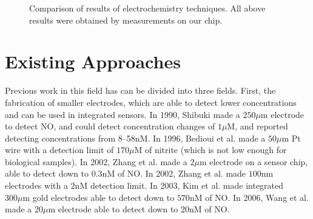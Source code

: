 \begin{figure}
	\centering
	\caption[Comparison of results of electrochemistry techniques]{Comparison of results of electrochemistry techniques. All above results were obtained by measurements on our chip.}
\end{figure}

\section{Existing Approaches}

Previous work in this field has can be divided into three fields. First, the fabrication of smaller electrodes, which are able to detect lower concentrations and can be used in integrated sensors. In 1990, Shibuki \cite{shibuki1990emd} made a $250 \mu \mathrm{m}$ electrode to detect NO, and could detect concentration changes of $1 \mu \mathrm{M}$, and reported detecting concentrations from 8--58$\mathrm{nM}$. In 1996, Bedioui et al. \cite{bedioui1996cmm} made a $50 \mu \mathrm{m}$ Pt wire with a detection limit of $170 \mu \mathrm{M}$ of nitrite (which is not low enough for biological samples). In 2002, Zhang et al. \cite{zhang2002nmn} made a $2 \mu \mathrm{m}$ electrode on a sensor chip, able to detect down to $0.3 \mathrm{nM}$ of NO. In 2002, Zhang et al. \cite{zhang2002nse} made $100 \mathrm{nm}$ electrodes with a $2 \mathrm{nM}$ detection limit. In 2003, Kim et al. \cite{kim2003img} made integrated $300 \mu \mathrm{m}$ gold electrodes able to detect down to $570 \mathrm{nM}$ of NO. In 2006, Wang et al. \cite{wang2005mcn} made a $20 \mu \mathrm{m}$ electrode able to detect down to $20 \mathrm{nM}$ of NO.

